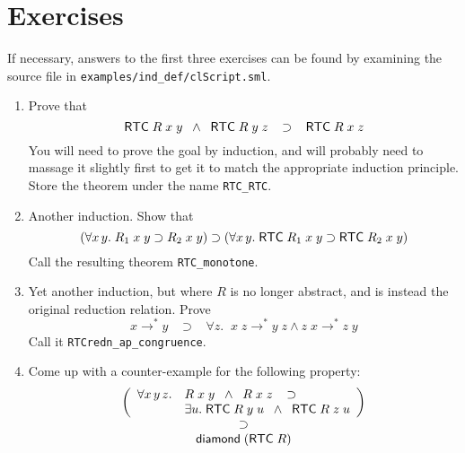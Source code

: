 \section{Exercises}

If necessary, answers to the first three exercises can be found by
examining the source file in \texttt{examples/ind\_def/clScript.sml}.

\begin{enumerate}
\item Prove that \[{\sf RTC}\;R \;x\; y \;\;\land \;\;
  {\sf RTC}\;R\;y\;z\;\;\;\supset\;\;\; {\sf RTC}\;R\;x\;z
\] You will need to prove the goal by induction, and will probably
  need to massage it slightly first to get it to match the appropriate
  induction principle.  Store the theorem under the name
  \texttt{RTC\_RTC}.
\item Another induction.  Show that \[
  (\forall x\,y.\; R_1\;x\;y\supset R_2\;x\;y) \supset
  (\forall x\,y.\; {\sf RTC}\;R_1\;x\;y \supset {\sf RTC}\;R_2\;x\;y)
\] Call the resulting theorem \texttt{RTC\_monotone}.
\item Yet another  induction, but where $R$ is no longer
  abstract, and is instead the original reduction relation.  Prove
\[
x \rightarrow^* y \;\;\;\supset\;\;\;
\forall z.\;\; x\;z \rightarrow^* y \;z \land
z\;x \rightarrow^* z\;y
\] Call it \texttt{RTCredn\_ap\_congruence}.

\item Come up with a counter-example for the following property: \[
\begin{array}{c}
  \left(
    \begin{array}{ll}
      \forall x\,y\,z. &
      R\;x\;y\;\;\land\;\; R\;x\;z \;\;\;\supset\\
      & \exists u.\;{\sf RTC}\;R\;y\;u \;\;\land\;\;{\sf RTC}\;R\;z\;u
      \end{array}\right)\\
    \supset\\
    {\sf diamond}\;({\sf RTC}\;R)
  \end{array}
  \]
\end{enumerate}

